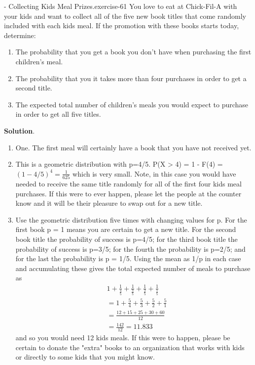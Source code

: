 \documentclass[10pt,]{book}
\numberwithin{equation}{section}
\begin{document}
\begin{inlineexercise}{- Collecting Kids Meal Prizes.}{exercise-61}%
\hypertarget{p-931}{}%
You love to eat at Chick-Fil-A with your kids and want to collect all of the five new book titles that come randomly included with each kids meal.  If the promotion with these books starts today, determine: \leavevmode%
\begin{enumerate}
\item\hypertarget{li-273}{}The probability that you get a book you don't have when purchasing the first children's meal.%
\item\hypertarget{li-274}{}The probability that you it takes more than four purchases in order to get a second title.%
\item\hypertarget{li-275}{}The expected total number of children's meals you would expect to purchase in order to get all five titles.%
\end{enumerate}
%
\textbf{Solution}.\quad%
\hypertarget{p-932}{}%
\leavevmode%
\begin{enumerate}
\item\hypertarget{li-276}{}One. The first meal will certainly have a book that you have not received yet.%
\item\hypertarget{li-277}{}This is a geometric distribution with p=4/5.  P(X > 4) = 1 - F(4) = \((1 - 4/5)^4 = \frac{1}{625}\) which is very small. Note, in this case you would have needed to receive the same title randomly for all of the first four kids meal purchases. If this were to ever happen, please let the people at the counter know and it will be their pleasure to swap out for a new title.%
\item\hypertarget{li-278}{}Use the geometric distribution five times with changing values for p. For the first book p = 1 means you are certain to get a new title. For the second book title the probability of success is p=4/5; for the third book title the probability of success is p=3/5; for the fourth the probability is p=2/5; and for the last the probability is p = 1/5. Using the mean as 1/p in each case and accumulating these gives the total expected number of meals to purchase as%
\begin{align*}
& 1 + \frac{1}{\frac{4}{5}} + \frac{1}{\frac{3}{5}} + \frac{1}{\frac{2}{5}} + \frac{1}{\frac{1}{5}} \\
& = 1 + \frac{5}{4} + \frac{5}{3} + \frac{5}{2} + \frac{5}{1} \\
& = \frac{12 + 15 + 25 + 30 + 60}{12} \\
& = \frac{142}{12} = 11.833
\end{align*}
and so you would need 12 kids meals.  If this were to happen, please be certain to donate the "extra" books to an organization that works with kids or directly to some kids that you might know.%
\end{enumerate}
%
\end{inlineexercise}
\end{document}

